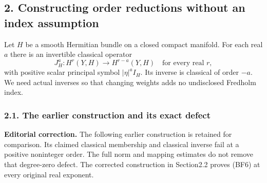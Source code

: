 \documentclass[
  11pt,
]{article}
\makeatletter
\let\ReaderOriginalAnchorStart\hyper@anchorstart
\let\ReaderOriginalAnchorEnd\hyper@anchorend
\let\ReaderPendingAliases\@empty
\def\ReaderArmAliases#1{\gdef\ReaderPendingAliases{#1}}
\def\hyper@anchorstart#1{\ReaderIfNativeAnchorTF{#1}{\ReaderPendingAliases\global\let\ReaderPendingAliases\@empty}{}\ReaderOriginalAnchorStart{#1}}
\makeatother
\begin{document}
\ReaderArmAliases{\ReaderOriginalAnchorStart{AN03-GFB-002}\ReaderOriginalAnchorEnd\begingroup\expandafter\def\csname @currentHref\endcsname{AN03-GFB-002}\label{AN03-GFB-002}\endgroup\ReaderOriginalAnchorStart{an03-gfb-002-constructing-order-reductions-without-an-index-assumption}\ReaderOriginalAnchorEnd\begingroup\expandafter\def\csname @currentHref\endcsname{an03-gfb-002-constructing-order-reductions-without-an-index-assumption}\label{an03-gfb-002-constructing-order-reductions-without-an-index-assumption}\endgroup\ReaderOriginalAnchorStart{2-constructing-order-reductions-without-an-index-assumption}\ReaderOriginalAnchorEnd\begingroup\expandafter\def\csname @currentHref\endcsname{2-constructing-order-reductions-without-an-index-assumption}\label{2-constructing-order-reductions-without-an-index-assumption}\endgroup\ReaderOriginalAnchorStart{constructing-order-reductions-without-an-index-assumption}\ReaderOriginalAnchorEnd}
\subsection{2. Constructing order reductions without an index
assumption}\label{constructing-order-reductions-without-an-index-assumption}

Let \(H\) be a smooth Hermitian bundle on a closed compact manifold. For
each real \(a\) there is an invertible classical operator \[
 J_H^a:H^r(Y,H)\longrightarrow H^{r-a}(Y,H)
 \quad\text{for every real }r,
 \tag{BF6}
\] with positive scalar principal symbol \(|\eta|^a I_H\). Its inverse
is classical of order \(-a\). We need actual inverses so that changing
weights adds no undisclosed Fredholm index.

\subsubsection{2.1. The earlier construction and its exact
defect}\label{the-earlier-construction-and-its-exact-defect}

\textbf{Editorial correction.} The following earlier construction is
retained for comparison. Its claimed classical membership and classical
inverse fail at a positive noninteger order. The full norm and mapping
estimates do not remove that degree-zero defect. The corrected
construction in Section2.2 proves (BF6) at every original real exponent.
\end{document}
